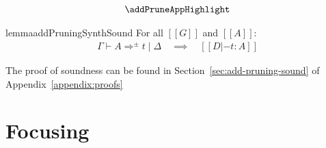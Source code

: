 \begin{align*}
  \begin{array}{c}
    \addPruneAppHighlight
  \end{array}
\end{align*}

\begin{restatable}{lemma}{addPruningSynthSound}
\label{lemma:addPruningSynthSound} For all $[[ G ]]$ and $[[ A ]]$:
%
\begin{align*}
\Gamma \vdash A \Rightarrow^{\pm} t \mid \Delta \quad \implies \quad [[ D |- t : A ]]
\end{align*}
\end{restatable}
The proof of soundness can be found in Section~\ref{sec:add-pruning-sound} of
Appendix~\ref{appendix:proofs}

\section{Focusing}
\label{sec:linear-base-focusing}

